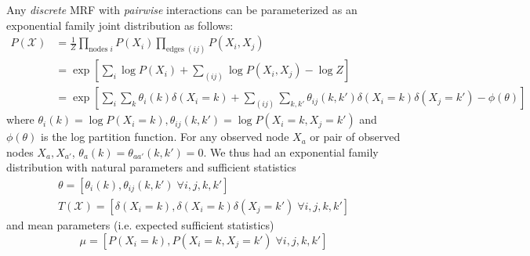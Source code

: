 \documentclass[a4paper]{article}
\begin{document}
Any \emph{discrete} MRF with \emph{pairwise} interactions can be parameterized as an exponential family joint distribution as follows:
\begin{align*}
P(\mathcal{X}) &= \frac{1}{Z}\prod_{\text{nodes } i} P(X_i) \prod_{\text{edges } (ij)} P(X_i,X_j) \\
&= \exp\left[ \sum_i \log P(X_i) + \sum_{(ij)} \log P(X_i,X_j) - \log Z \right] \\
&= \exp\left[ \sum_i\sum_k \theta_i(k)\delta(X_i = k) + \sum_{(ij)}\sum_{k,k'} \theta_{ij}(k,k') \delta(X_i = k)\delta(X_j = k') - \phi(\theta) \right]
\end{align*}
where $\theta_i(k) = \log P(X_i = k), \theta_{ij}(k,k') = \log P(X_i = k, X_j = k')$ and $\phi(\theta)$ is the log partition function. For any observed node $X_a$ or pair of observed nodes $X_a,X_{a'}$, $\theta_a(k) = \theta_{aa'}(k,k') = 0$. We thus had an exponential family distribution with natural parameters and sufficient statistics
\begin{gather*}{}
\theta = [\theta_i(k), \theta_{ij}(k,k')\; \forall i,j,k,k'] \\
T(\mathcal{X}) = [\delta(X_i = k), \delta(X_i = k)\delta(X_j = k')\; \forall i,j,k,k']
\end{gather*}
and mean parameters (i.e. expected sufficient statistics)
\[ \mu = [P(X_i = k), P(X_i = k, X_j = k')\; \forall i,j,k,k'] \]
\end{document}
